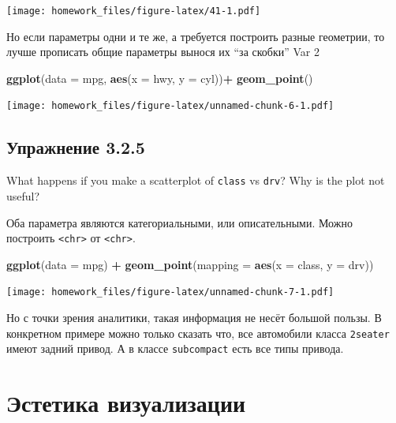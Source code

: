 \documentclass[]{book}
\newenvironment{Shaded}{\begin{snugshade}}{\end{snugshade}}
\newcommand{\KeywordTok}[1]{\textcolor[rgb]{0.13,0.29,0.53}{\textbf{#1}}}
\newcommand{\DataTypeTok}[1]{\textcolor[rgb]{0.13,0.29,0.53}{#1}}
\newcommand{\StringTok}[1]{\textcolor[rgb]{0.31,0.60,0.02}{#1}}
\newcommand{\OperatorTok}[1]{\textcolor[rgb]{0.81,0.36,0.00}{\textbf{#1}}}
\newcommand{\NormalTok}[1]{#1}
\begin{document}
\texttt{[image: homework\_files/figure-latex/41-1.pdf]}

Но если параметры одни и те же, а требуется построить разные геометрии,
то лучше прописать общие параметры вынося их ``за скобки'' Var 2

\begin{Shaded}
\begin{Highlighting}[]
\KeywordTok{ggplot}\NormalTok{(}\DataTypeTok{data =}\NormalTok{ mpg, }\KeywordTok{aes}\NormalTok{(}\DataTypeTok{x =}\NormalTok{ hwy, }\DataTypeTok{y =}\NormalTok{ cyl))}\OperatorTok{+}
\StringTok{ }\KeywordTok{geom_point}\NormalTok{()}
\end{Highlighting}
\end{Shaded}

\texttt{[image: homework\_files/figure-latex/unnamed-chunk-6-1.pdf]}

\subsection*{Упражнение 3.2.5}\label{-3.2.5}

What happens if you make a scatterplot of \texttt{class} vs
\texttt{drv}? Why is the plot not useful?

Оба параметра являются категориальными, или описательными. Можно
построить \texttt{\textless{}chr\textgreater{}} от
\texttt{\textless{}chr\textgreater{}}.

\begin{Shaded}
\begin{Highlighting}[]
\KeywordTok{ggplot}\NormalTok{(}\DataTypeTok{data =}\NormalTok{ mpg) }\OperatorTok{+}\StringTok{ }\KeywordTok{geom_point}\NormalTok{(}\DataTypeTok{mapping =} \KeywordTok{aes}\NormalTok{(}\DataTypeTok{x =}\NormalTok{ class, }\DataTypeTok{y =}\NormalTok{ drv))}
\end{Highlighting}
\end{Shaded}

\texttt{[image: homework\_files/figure-latex/unnamed-chunk-7-1.pdf]}

Но с точки зрения аналитики, такая информация не несёт большой пользы. В
конкретном примере можно только сказать что, все автомобили класса
\texttt{2seater} имеют задний привод. А в классе \texttt{subcompact}
есть все типы привода.

\section{Эстетика визуализации}\label{-}
\end{document}
